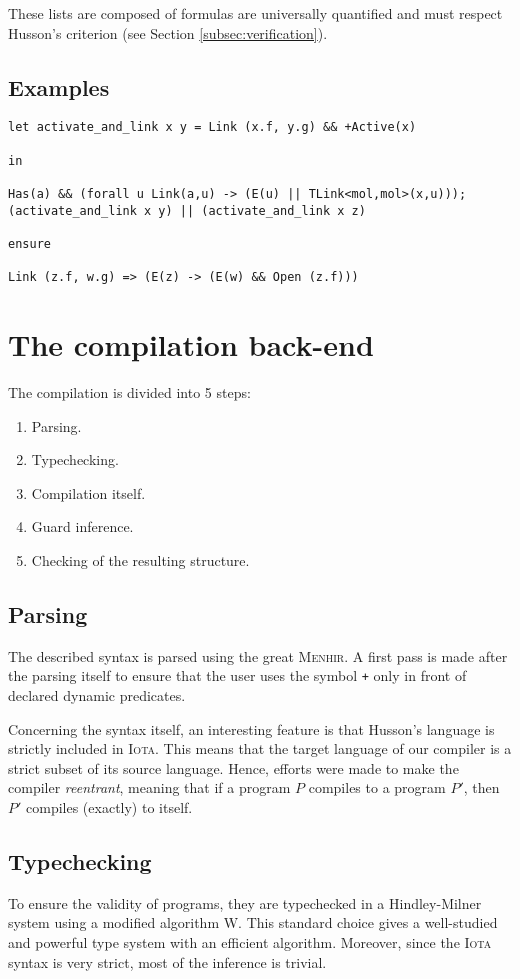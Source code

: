 \documentclass[10pt,a4paper]{article}
\newcommand\Iota{\textsc{Iota}}
\newcommand\Menhir{\textsc{Menhir}}
\newcommand{\ocaml}{\texttt}
\begin{document}
These lists are composed of formulas are universally quantified and must respect Husson's criterion (see Section \ref{subsec:verification}).

\subsection{Examples}
\label{configex}
\begin{verbatim}
let activate_and_link x y = Link (x.f, y.g) && +Active(x)

in

Has(a) && (forall u Link(a,u) -> (E(u) || TLink<mol,mol>(x,u)));
(activate_and_link x y) || (activate_and_link x z)

ensure

Link (z.f, w.g) => (E(z) -> (E(w) && Open (z.f)))
\end{verbatim}


\section{The compilation back-end}
The compilation is divided into 5 steps:
\begin{enumerate}
\item Parsing.
\item Typechecking.
\item Compilation itself.
\item Guard inference.
\item Checking of the resulting structure.
\end{enumerate}

\subsection{Parsing}
The described syntax is parsed using the great \Menhir{}\cite{menhir}. A first pass is made after the parsing itself to ensure that the user uses the symbol \ocaml{+} only in front of declared dynamic predicates.

Concerning the syntax itself, an interesting feature is that Husson's language is strictly included in \Iota{}. This means that the target language of our compiler is a strict subset of its source language. Hence, efforts were made to make the compiler \emph{reentrant}, meaning that if a program $P$ compiles to a program $P'$, then $P'$ compiles (exactly) to itself.

\subsection{Typechecking}
To ensure the validity of programs, they are typechecked in a Hindley-Milner system\cite{hindley} using a modified algorithm W\cite{milner}.
This standard choice gives a well-studied and powerful type system with an efficient algorithm. Moreover, since the \Iota{} syntax is very strict, most of the inference is trivial.
\end{document}
